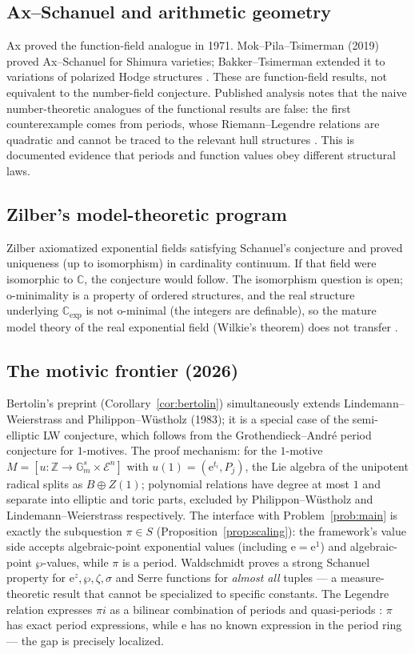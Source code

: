 \documentclass[11pt]{amsart}
\theoremstyle{definition}
\theoremstyle{remark}
\numberwithin{equation}{section}
\newcommand{\C}{\mathbb{C}}
\newcommand{\Z}{\mathbb{Z}}
\newcommand{\ee}{\mathrm{e}}
\begin{document}
\subsection{Ax--Schanuel and arithmetic geometry}

Ax proved the function-field analogue in 1971. Mok--Pila--Tsimerman (2019) proved Ax--Schanuel for Shimura varieties; Bakker--Tsimerman extended it to variations of polarized Hodge structures \cite{MPT2019}. These are function-field results, not equivalent to the number-field conjecture. Published analysis notes that the naive number-theoretic analogues of the functional results are false: the first counterexample comes from periods, whose Riemann--Legendre relations are quadratic and cannot be traced to the relevant hull structures \cite{CambridgeFF}. This is documented evidence that periods and function values obey different structural laws.

\subsection{Zilber's model-theoretic program}

Zilber axiomatized exponential fields satisfying Schanuel's conjecture and proved uniqueness (up to isomorphism) in cardinality continuum. If that field were isomorphic to $\C$, the conjecture would follow. The isomorphism question is open; o-minimality is a property of ordered structures, and the real structure underlying $\C_{\exp}$ is not o-minimal (the integers are definable), so the mature model theory of the real exponential field (Wilkie's theorem) does not transfer \cite{MO33817}.

\subsection{The motivic frontier (2026)}

Bertolin's preprint \cite{Bertolin2026} (Corollary~\ref{cor:bertolin}) simultaneously extends Lindemann--Weierstrass and Philippon--W\"ustholz (1983); it is a special case of the semi-elliptic LW conjecture, which follows from the Grothendieck--André period conjecture for $1$-motives. The proof mechanism: for the $1$-motive $M=[u:\Z\to\mathbb G_m^s\times\mathcal E^n]$ with $u(1)=(\ee^{t_i},P_j)$, the Lie algebra of the unipotent radical splits as $B\oplus Z(1)$; polynomial relations have degree at most $1$ and separate into elliptic and toric parts, excluded by Philippon--W\"ustholz and Lindemann--Weierstrass respectively. The interface with Problem~\ref{prob:main} is exactly the subquestion $\pi\in S$ (Proposition~\ref{prop:scaling}): the framework's value side accepts algebraic-point exponential values (including $\ee=\ee^1$) and algebraic-point $\wp$-values, while $\pi$ is a period. Waldschmidt \cite{Waldschmidt2025} proves a strong Schanuel property for $\ee^z,\wp,\zeta,\sigma$ and Serre functions for \emph{almost all} tuples --- a measure-theoretic result that cannot be specialized to specific constants. The Legendre relation expresses $\pi i$ as a bilinear combination of periods and quasi-periods \cite{DLMF23}: $\pi$ has exact period expressions, while $\ee$ has no known expression in the period ring --- the gap is precisely localized.
\end{document}

